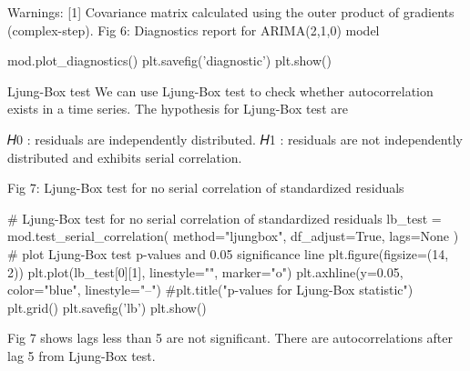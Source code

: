 Warnings:
[1] Covariance matrix calculated using the outer product of gradients (complex-step).
Fig 6: Diagnostics report for ARIMA(2,1,0) model

mod.plot_diagnostics()
plt.savefig('diagnostic')
plt.show()

Ljung-Box test
We can use Ljung-Box test to check whether autocorrelation exists in a time series. The hypothesis for Ljung-Box test are

𝐻0 : residuals are independently distributed.
𝐻1 : residuals are not independently distributed and exhibits serial correlation.

Fig 7: Ljung-Box test for no serial correlation of standardized residuals

# Ljung-Box test for no serial correlation of standardized residuals
lb_test = mod.test_serial_correlation(
    method="ljungbox", df_adjust=True, lags=None
)
​
# plot Ljung-Box test p-values and 0.05 significance line
plt.figure(figsize=(14, 2))
plt.plot(lb_test[0][1], linestyle="", marker="o")
plt.axhline(y=0.05, color="blue", linestyle="--")
#plt.title("p-values for Ljung-Box statistic")
plt.grid()
plt.savefig('lb')
plt.show()

Fig 7 shows lags less than 5 are not significant. There are autocorrelations after lag 5 from Ljung-Box test.

